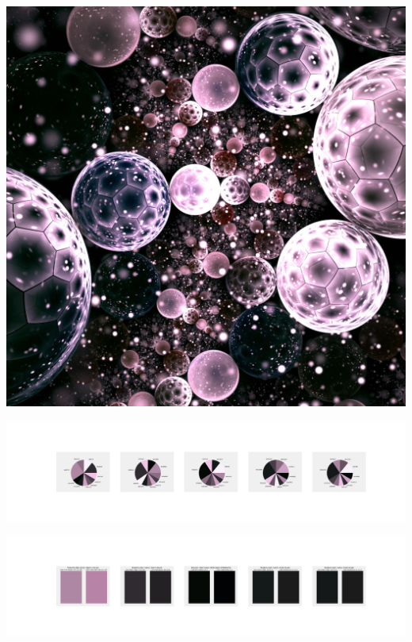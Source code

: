 \documentclass[11pt]{article}
\begin{document}
\begin{landscape}
    \begin{center}
    \includegraphics[width=\textwidth]{./nbimg/file (289).jpg}
    \end{center}

    \begin{center}
    \includegraphics[width=250mm]{./nbimg/pie-210.jpg}
    \end{center}

    \begin{center}
    \includegraphics[width=250mm]{./nbimg/peak-210.jpg}
    \end{center}
    


\end{landscape}
\end{document}
